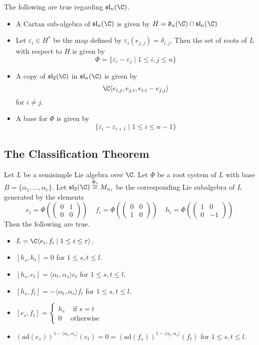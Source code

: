 \documentclass[a4paper]{article}
\begin{document}
\begin{eg}{}{} The following are true regarding $\mathfrak{sl}_n(\C)$. 
\begin{itemize}
\item A Cartan sub-algebra of $\mathfrak{sl}_n(\C)$ is given by $H=\mathfrak{d}_n(\C)\cap\mathfrak{sl}_n(\C)$
\item Let $\varepsilon_i\in H^\ast$ be the map defined by $\varepsilon_i(e_{j,j})=\delta_{i,j}$. Then the set of roots of $L$ with respect to $H$ is given by $$\Phi=\{\varepsilon_i-\varepsilon_j\;|\;1\leq i,j\leq n\}$$
\item A copy of $\mathfrak{sl}_2(\C)$ in $\mathfrak{sl}_n(\C)$ is given by $$\C\langle e_{i,j},e_{j,i}, e_{i,i}-e_{j,j}\rangle$$ for $i\neq j$. 
\item A base for $\Phi$ is given by $$\{\varepsilon_i-\varepsilon_{i+1}\;|\;1\leq i\leq n-1\}$$
\end{itemize}
\end{eg}

\subsection{The Classification Theorem}
\begin{prp}{}{} Let $L$ be a semisimple Lie algebra over $\C$. Let $\Phi$ be a root system of $L$ with base $B=\{\alpha_1,\dots,\alpha_r\}$. Let $\mathfrak{sl}_2(\C)\overset{\Phi_i}{\cong}M_{\alpha_i}$ be the corresponding Lie subalgebra of $L$ generated by the elements $$e_i=\Phi\left(\begin{pmatrix}
0 & 1\\
0 & 0
\end{pmatrix}\right)\;\;\;\;f_i=\Phi\left(\begin{pmatrix}
0 & 0\\
1 & 0
\end{pmatrix}\right)\;\;\;\;h_i=\Phi\left(\begin{pmatrix}
1 & 0\\
0 & -1
\end{pmatrix}\right)$$ Then the following are true. 
\begin{itemize}
\item $L=\C\langle e_i,f_i\;|\;1\leq i\leq r\rangle$. 
\item $[h_s,h_t]=0$ for $1\leq s,t\leq l$. 
\item $[h_s,e_t]=\langle\alpha_t,\alpha_s\rangle e_t$ for $1\leq s,t\leq l$. 
\item $[h_s,f_t]=-\langle\alpha_t,\alpha_s\rangle f_t$ for $1\leq s,t\leq l$. 
\item $[e_s,f_t]=\begin{cases}
h_s & \text{ if } s=t\\
0 & \text{otherwise}
\end{cases}$
\item $\left(\text{ad}(e_s)\right)^{1-\langle\alpha_t,\alpha_s\rangle}(e_t)=0=\left(\text{ad}(f_s)\right)^{1-\langle\alpha_t,\alpha_s\rangle}(f_t)$ for $1\leq s,t\leq l$. 
\end{itemize}
\end{prp}
\end{document}
